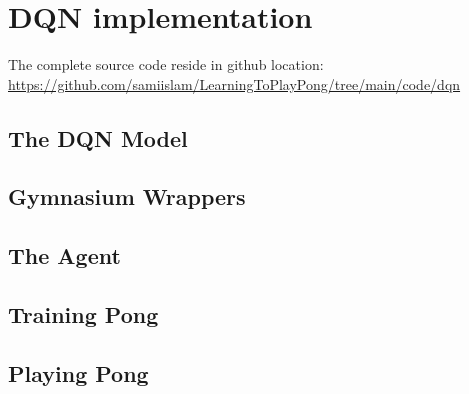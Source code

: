 \chapter {DQN implementation}

The complete source code reside in github location: \url{https://github.com/samiislam/LearningToPlayPong/tree/main/code/dqn}

\section{The DQN Model}


\section{Gymnasium Wrappers}


\section{The Agent}


\section{Training Pong}


\section{Playing Pong}


